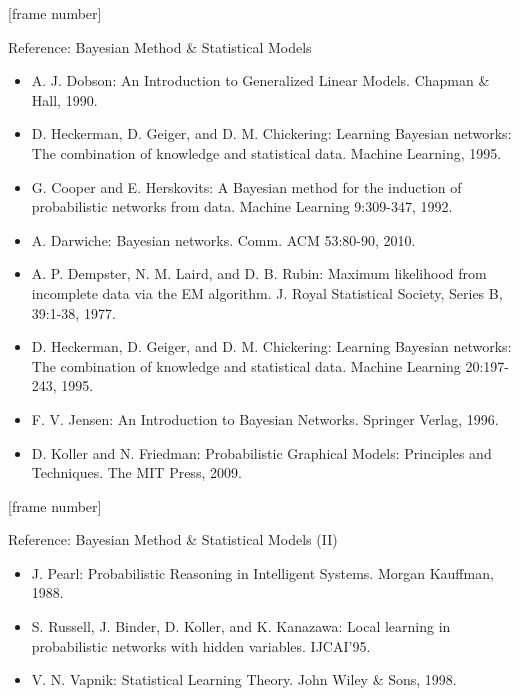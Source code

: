 \documentclass[aspectratio=169,t,table]{beamer}
\begin{document}
  {
    [frame number]
    \begin{frame}{Reference: Bayesian Method \& Statistical Models}
      \begin{itemize}
        \item A. J. Dobson: An Introduction to Generalized Linear Models. Chapman \& Hall, 1990.
        \item D. Heckerman, D. Geiger, and D. M. Chickering: Learning Bayesian networks: The combination of knowledge and statistical data. Machine Learning, 1995.
        \item G. Cooper and E. Herskovits: A Bayesian method for the induction of probabilistic networks from data. Machine Learning 9:309-347, 1992.
        \item A. Darwiche: Bayesian networks. Comm. ACM 53:80-90, 2010.
        \item A. P. Dempster, N. M. Laird, and D. B. Rubin: Maximum likelihood from incomplete data via the EM algorithm. J. Royal Statistical Society, Series B, 39:1-38, 1977.
        \item D. Heckerman, D. Geiger, and D. M. Chickering: Learning Bayesian networks: The combination of knowledge and statistical data. Machine Learning 20:197-243, 1995.
        \item F. V. Jensen: An Introduction to Bayesian Networks. Springer Verlag, 1996.
        \item D. Koller and N. Friedman: Probabilistic Graphical Models: Principles and Techniques. The MIT Press, 2009.
      \end{itemize}
    \end{frame}
  }

  {
    [frame number]
    \begin{frame}{Reference: Bayesian Method \& Statistical Models (II)}
      \begin{itemize}
        \item J. Pearl: Probabilistic Reasoning in Intelligent Systems. Morgan Kauffman, 1988.
        \item S. Russell, J. Binder, D. Koller, and K. Kanazawa: Local learning in probabilistic networks with hidden variables. IJCAI'95.
        \item V. N. Vapnik: Statistical Learning Theory. John Wiley \& Sons, 1998.
      \end{itemize}
    \end{frame}
  }
\end{document}
